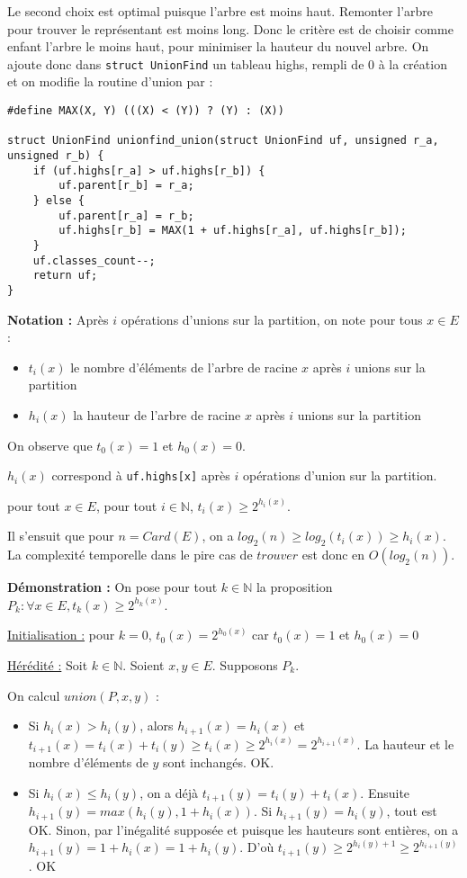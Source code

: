 \documentclass[../../../main.tex]{subfiles}
\begin{document}
Le second choix est optimal puisque l'arbre est moins haut. Remonter l'arbre pour trouver le représentant est moins long. Donc le critère est de choisir comme enfant l'arbre le moins haut, pour minimiser la hauteur du nouvel arbre. On ajoute donc dans \texttt{struct UnionFind} un tableau \textsf{highs}, rempli de $0$ à la création et on modifie la routine d'union par :
\begin{verbatim}
#define MAX(X, Y) (((X) < (Y)) ? (Y) : (X))

struct UnionFind unionfind_union(struct UnionFind uf, unsigned r_a, unsigned r_b) {
	if (uf.highs[r_a] > uf.highs[r_b]) {
		uf.parent[r_b] = r_a;
	} else {
		uf.parent[r_a] = r_b;
		uf.highs[r_b] = MAX(1 + uf.highs[r_a], uf.highs[r_b]);
	}
	uf.classes_count--;
	return uf;
}
\end{verbatim}
\textbf{Notation :} Après $i$ opérations d'unions sur la partition, on note pour tous $x\in E$ :
\begin{itemize}
	\item $t_i(x)$ le nombre d'éléments de l'arbre de racine $x$ après $i$ unions sur la partition
	\item $h_i(x)$ la hauteur de l'arbre de racine $x$ après $i$ unions sur la partition
\end{itemize}
On observe que $t_0(x) = 1$ et $h_0(x) = 0$.

$h_i(x)$ correspond à \texttt{uf.highs[x]} après $i$ opérations d'union sur la partition.

 pour tout $x\in E$, pour tout $i\in \mathbb{N}$, $t_i(x)\geq 2^{h_i(x)}$.

Il s'ensuit que pour $n = Card(E)$, on a $log_2(n) \geq log_2(t_i(x))\geq h_i(x)$. La complexité temporelle dans le pire cas de $trouver$ est donc en $O(log_2(n))$.

\textbf{Démonstration :} On pose pour tout $k\in\mathbb{N}$ la proposition $P_k : \forall x\in E, t_k(x)\geq 2^{h_k(x)}$.

\underline{Initialisation :} pour $k = 0$, $t_0(x) = 2^{h_0(x)}$ car $t_0(x) = 1$ et $h_0(x) = 0$

\underline{Hérédité :} Soit $k\in\mathbb{N}$. Soient $x, y\in E$. Supposons $P_k$.

On calcul $union(P, x, y)$ :
\begin{itemize}
	\item Si $h_i(x) > h_i(y)$, alors $h_{i+1}(x) = h_i(x)$ et $t_{i+1}(x) = t_i(x) + t_i(y) \geq t_i(x) \geq 2^{h_{i}(x)} = 2^{h_{i+1}(x)}$. La hauteur et le nombre d'éléments de $y$ sont inchangés. OK.
	\item Si $h_i(x) \leq h_i(y)$, on a déjà $t_{i+1}(y) = t_i(y) + t_i(x)$. Ensuite $h_{i+1}(y) = max(h_i(y), 1 + h_i(x))$. Si $h_{i+1}(y) = h_i(y)$, tout est OK. Sinon, par l'inégalité supposée et puisque les hauteurs sont entières, on a $h_{i+1}(y) = 1 + h_i(x) = 1 + h_i(y)$. D'où $t_{i+1}(y) \geq 2^{h_i(y) + 1}\geq 2^{h_{i+1}(y)}$ . OK
\end{itemize}
\end{document}
